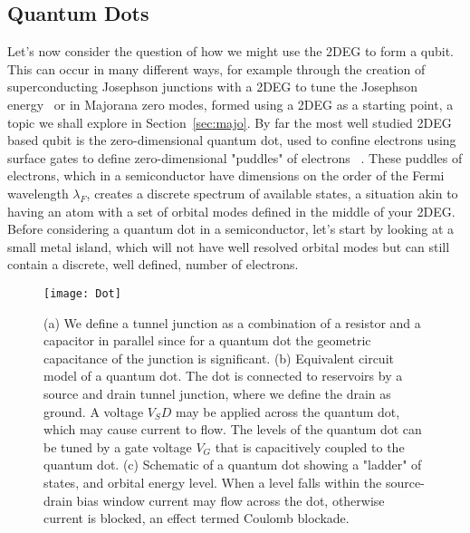 \subsection{Quantum Dots}
\label{sec:qd}
Let's now consider the question of how we might use the 2DEG to form a qubit. This can occur in many different
ways, for example through the creation of superconducting Josephson junctions with a 2DEG to tune the Josephson
energy~\cite{karl-gatemon} or in Majorana zero modes\cite{PhysRevLett.119.136803}, formed using a 2DEG as a starting
point, a topic we shall explore in Section~\ref{sec:majo}. By far the most well studied 2DEG based qubit is the zero-dimensional
quantum dot, used to confine electrons using surface gates to define zero-dimensional "puddles" of electrons
~\cite{RevModPhys.79.1217,RevModPhys.75.1}.
These puddles of electrons, which in a semiconductor have dimensions on the order of the Fermi wavelength $\lambda_F$,
creates a discrete spectrum of available states, a situation akin to having an atom with a set of orbital modes
defined in the middle of your 2DEG\cite{PhysRevLett.77.3613}. Before considering a quantum dot in a semiconductor, let's
start by looking at a small metal island, which will not have well resolved orbital modes but can still contain a discrete,
well defined, number of electrons.

\begin{figure}
  \texttt{[image: Dot]}
  \caption[Schematic of a single quantum dot]
  {\label{fig:QD}(a) We define a tunnel junction as a combination of a resistor and a capacitor in parallel
  since for a quantum dot the geometric capacitance of the junction is significant. (b) Equivalent circuit
  model of a quantum dot. The dot is connected to reservoirs by a source and drain tunnel junction, where
  we define the drain as ground. A voltage $V_SD$ may be applied across the quantum dot, which may cause current
  to flow. The levels of the quantum dot can be tuned by a gate voltage $V_G$ that is capacitively coupled to the
  quantum dot. (c) Schematic of a quantum dot showing a "ladder" of states, and orbital energy level. When a level
  falls within the source-drain bias window current may flow across the dot, otherwise current is blocked, an
  effect termed Coulomb blockade.}
\end{figure}

